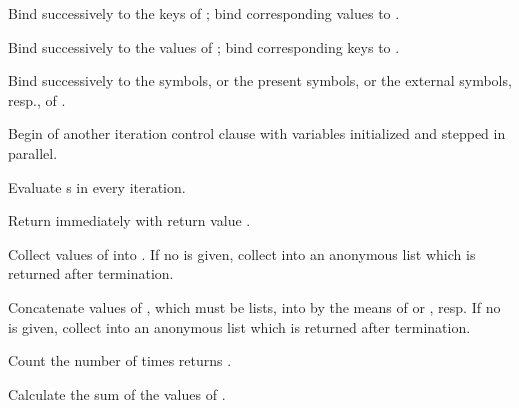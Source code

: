 \begin{LIST}{1cm}
\begin{LIST}{.5cm}
\begin{LIST}{.5cm}
\begin{LIST}{.5cm}
        Bind  successively to the keys of ; bind corresponding values to .

        Bind  successively to the values of ; bind corresponding keys to .

        Bind  successively to the symbols, or the present symbols, or the external symbols, resp., of .

      \end{LIST}
    \end{LIST}
    
    Begin of another iteration control clause with variables initialized and stepped in parallel.

    Evaluate s in every iteration.
    
    Return immediately with return value .
    
    Collect values of  into . If no  is given, collect into an anonymous list
    which is returned after termination.

    Concatenate values of , which must be lists, into  by the means of  
    or , resp.  If no  is given, collect into an anonymous list
    which is returned after termination.

    Count the number of times  returns \T.
    
    Calculate the sum of the values of .
    

\end{LIST}
\end{LIST}
